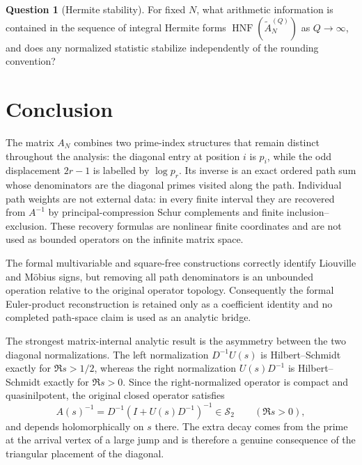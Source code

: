 \documentclass[11pt]{amsart}
\numberwithin{equation}{section}
\theoremstyle{plain}
\theoremstyle{definition}
\newtheorem{question}[theorem]{Question}
\theoremstyle{remark}
\begin{document}
\begin{question}[Hermite stability]
\label{question:hermite_stability}
For fixed $N$, what arithmetic information is contained in the sequence of integral Hermite forms $\operatorname{HNF}(\widetilde A_N^{(Q)})$ as $Q\to\infty$, and does any normalized statistic stabilize independently of the rounding convention?
\end{question}

\section{Conclusion}
\label{sec:conclusion}

The matrix $A_N$ combines two prime-index structures that remain distinct throughout the analysis: the diagonal entry at position $i$ is $p_i$, while the odd displacement $2r-1$ is labelled by $\log p_r$.  Its inverse is an exact ordered path sum whose denominators are the diagonal primes visited along the path.  Individual path weights are not external data: in every finite interval they are recovered from $A^{-1}$ by principal-compression Schur complements and finite inclusion--exclusion.  These recovery formulas are nonlinear finite coordinates and are not used as bounded operators on the infinite matrix space.

The formal multivariable and square-free constructions correctly identify Liouville and M\"obius signs, but removing all path denominators is an unbounded operation relative to the original operator topology.  Consequently the formal Euler-product reconstruction is retained only as a coefficient identity and no completed path-space claim is used as an analytic bridge.

The strongest matrix-internal analytic result is the asymmetry between the two diagonal normalizations.  The left normalization $D^{-1}U(s)$ is Hilbert--Schmidt exactly for $\Re s>1/2$, whereas the right normalization $U(s)D^{-1}$ is Hilbert--Schmidt exactly for $\Re s>0$.  Since the right-normalized operator is compact and quasinilpotent, the original closed operator satisfies
\begin{equation}
A(s)^{-1}=D^{-1}(I+U(s)D^{-1})^{-1}\in\mathcal S_2
\qquad (\Re s>0),
\end{equation}
and depends holomorphically on $s$ there.  The extra decay comes from the prime at the arrival vertex of a large jump and is therefore a genuine consequence of the triangular placement of the diagonal.
\end{document}
